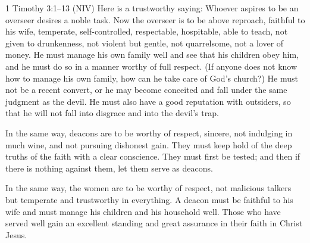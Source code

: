 \begin{frame}{1 Timothy 3:1--13 (NIV)}
Here is a trustworthy saying: Whoever aspires to be an overseer desires a noble
task.
Now the overseer is to be above reproach, faithful to his wife, temperate,
self-controlled, respectable, hospitable, able to teach, not given to
drunkenness, not violent but gentle, not quarrelsome, not a lover of money. 
He must manage his own family well and see that his children obey him, and he
must do so in a manner worthy of full respect. 
(If anyone does not know how to manage his own family, how can he take care of
God's church?) 
He must not be a recent convert, or he may become conceited and fall under the
same judgment as the devil. 
He must also have a good reputation with outsiders, so that he will not fall
into disgrace and into the devil's trap.
\end{frame}

\begin{frame}
In the same way, deacons are to be worthy of respect, sincere, not indulging in
much wine, and not pursuing dishonest gain. 
They must keep hold of the deep truths of the faith with a clear conscience. 
They must first be tested; and then if there is nothing against them, let them
serve as deacons.

In the same way, the women are to be worthy of respect, not malicious talkers
but temperate and trustworthy in everything.
A deacon must be faithful to his wife and must manage his children and his
household well.
Those who have served well gain an excellent standing and great assurance in
their faith in Christ Jesus.
\end{frame}
\endinput
